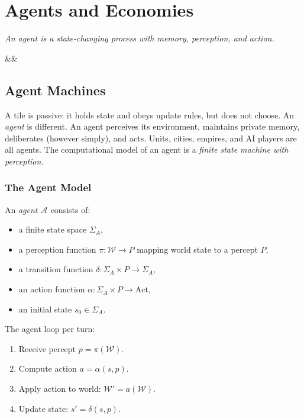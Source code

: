 \documentclass[11pt,a4paper,openany]{book}
\theoremstyle{plain}
\theoremstyle{definition}
\theoremstyle{remark}
\newenvironment{background}{%
  \begin{mdframed}[
    linecolor=sphereblue!40, backgroundcolor=sphereblue!5,
    linewidth=1pt, innertopmargin=8pt, innerbottommargin=8pt,
    innerleftmargin=10pt, innerrightmargin=10pt,
    skipabove=10pt, skipbelow=6pt
  ]%
  \setlength{\parindent}{0pt}%
  \noindent{\textcolor{sphereblue}{\textbf{Background}}}\par\smallskip\ignorespaces
}{\end{mdframed}}
\newenvironment{defbox}[1]{%
  \begin{tcolorbox}[
    title={\textbf{Definition:} #1},
    colback=defbg,
    colframe=sphereamber!80,
    fonttitle=\bfseries,
    coltitle=sphereamber!60!black,
    sharp corners,
    breakable,
    before upper={\normalfont\setlength{\parindent}{0pt}\tolerance=9999\hbadness=9999}
  ]
}{\end{tcolorbox}}
\newcommand{\agent}[1]{\mathcal{A}_{#1}}
\newcommand{\world}{\ensuremath{\mathcal{W}}}
\newcommand{\chapterquote}[2]{%
  \par\vspace{0.8em}%
  \begin{flushright}%
    \begin{minipage}{0.65\textwidth}%
      {\itshape #1\par}%
      \ifx&#2&\else\vspace{0.3em}{\raggedleft\small--- #2\par}\fi%
    \end{minipage}%
  \end{flushright}%
  \vspace{0.8em}\par\noindent}
\begin{document}

\part{Agents and Economies}

\chapterquote{An agent is a state-changing process with memory,
  perception, and action.
}{}

\chapter{Agent Machines}
\label{ch:agents}

\begin{background}
  A tile is passive: it holds state and obeys update rules, but does not
  choose. An \emph{agent} is different. An agent perceives its environment,
  maintains private memory, deliberates (however simply), and acts. Units,
  cities, empires, and AI players are all agents. The computational model
  of an agent is a \emph{finite state machine with perception}.
\end{background}

\section{The Agent Model}

\begin{defbox}{Agent}
  An \emph{agent} $\agent{}$ consists of:
  \begin{itemize}
    \item a finite state space $\Sigma_A$,
    \item a perception function $\pi : \world \to P$ mapping world state
          to a percept $P$,
    \item a transition function $\delta : \Sigma_A \times P \to \Sigma_A$,
    \item an action function $\alpha : \Sigma_A \times P \to \text{Act}$,
    \item an initial state $s_0 \in \Sigma_A$.
  \end{itemize}
\end{defbox}

The agent loop per turn:
\begin{enumerate}
  \item Receive percept $p = \pi(\world)$.
  \item Compute action $a = \alpha(s, p)$.
  \item Apply action to world: $\world' = a(\world)$.
  \item Update state: $s' = \delta(s, p)$.
\end{enumerate}
\end{document}
